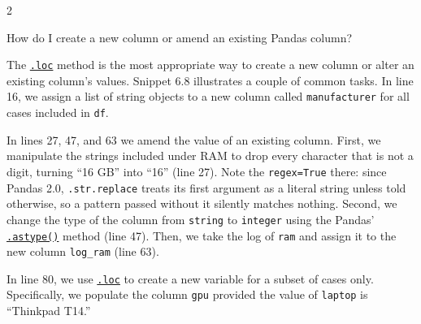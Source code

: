 \documentclass[a4paper,11pt]{book}
\newcommand{\question}[1]{%
    \begin{tcolorbox}[colback=comp_c!10,colframe=comp_c,sidebyside align=top,width=\linewidth,before skip=1ex]
        #1
    \end{tcolorbox}
    \switchcolumn%
}
\newcommand{\note}[1]{%
    \begin{tcolorbox}[colback=white!0,colframe=white!10,width=\linewidth,before skip=1ex]
        #1
    \end{tcolorbox}
}
\begin{document}
\begin{paracol}{2}
	\question{\raggedright How do I create a new column or amend an existing Pandas column?}
	\note{The \href{https://pandas.pydata.org/docs/reference/api/pandas.DataFrame.loc.html?highlight=loc\#pandas.DataFrame.loc}{\texttt{.loc}} method is the most appropriate way to create a new column or alter an existing column's values. Snippet 6.8 illustrates a couple of common tasks. In line 16, we assign a list of string objects to a new column called \texttt{manufacturer} for all cases included in \texttt{df}. 
	
	\quad In lines 27, 47, and 63 we amend the value of an existing column. First, we manipulate the strings included under RAM to drop every character that is not a digit, turning ``16 GB'' into ``16'' (line 27). Note the \texttt{regex=True} there: since Pandas 2.0, \texttt{.str.replace} treats its first argument as a literal string unless told otherwise, so a pattern passed without it silently matches nothing. Second, we change the type of the column from \texttt{string} to \texttt{integer} using the Pandas' \href{https://pandas.pydata.org/docs/reference/api/pandas.DataFrame.astype.html?highlight=astype\#pandas.DataFrame.astype}{\texttt{.astype()}} method (line 47). Then, we take the log of \texttt{ram} and assign it to the new column \texttt{log\_ram} (line 63). 
	
	\quad In line 80, we use \href{https://pandas.pydata.org/docs/reference/api/pandas.DataFrame.loc.html?highlight=loc\#pandas.DataFrame.loc}{\texttt{.loc}} to create a new variable for a subset of cases only. Specifically, we populate the column \texttt{gpu} provided the value of \texttt{laptop} is ``Thinkpad T14.''
	}
\end{paracol}
\end{document}
